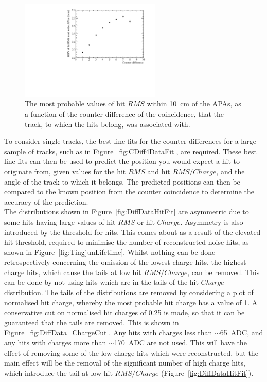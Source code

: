\begin{figure}
  \centering
  \includegraphics[width=0.6\textwidth]{InterceptCanvasData}
  \caption[The angular dependence of diffusion in the 35 ton dataset for hits within 10~cm of the APAs]
          {The most probable values of hit $RMS$ within 10~cm of the APAs, as a function of the counter difference of the coincidence, that the track, to which the hits belong, was associated with.}
  \label{fig:DiffData_AngFit}
\end{figure}

To consider single tracks, the best line fits for the counter differences for a large sample of tracks, such as in Figure~\ref{fig:CDiff4DataFit}, are required. These best line fits can then be used to predict the position you would expect a hit to originate from, given values for the hit $RMS$ and hit $RMS/Charge$, and the angle of the track to which it belongs. The predicted positions can then be compared to the known position from the counter coincidence to determine the accuracy of the prediction. \\

The distributions shown in Figure~\ref{fig:DiffDataHitFit} are asymmetric due to some hits having large values of hit $RMS$ or hit $Charge$. Asymmetry is also introduced by the threshold for hits. This comes about as a result of the elevated hit threshold, required to minimise the number of reconstructed noise hits, as shown in Figure~\ref{fig:TingjunLifetime}. Whilst nothing can be done retrospectively concerning the omission of the lowest charge hits, the highest charge hits, which cause the tails at low hit $RMS/Charge$, can be removed. This can be done by not using hits which are in the tails of the hit $Charge$ distribution. The tails of the distributions are removed by considering a plot of normalised hit charge, whereby the most probable hit charge has a value of 1. A conservative cut on normalised hit charges of 0.25 is made, so that it can be guaranteed that the tails are removed. This is shown in Figure~\ref{fig:DiffData_ChargeCut}. Any hits with charges less than $\sim$65~ADC, and any hits with charges more than $\sim$170~ADC are not used. This will have the effect of removing some of the low charge hits which were reconstructed, but the main effect will be the removal of the significant number of high charge hits, which introduce the tail at low hit $RMS/Charge$ (Figure~\ref{fig:DiffDataHitFit}). \\

